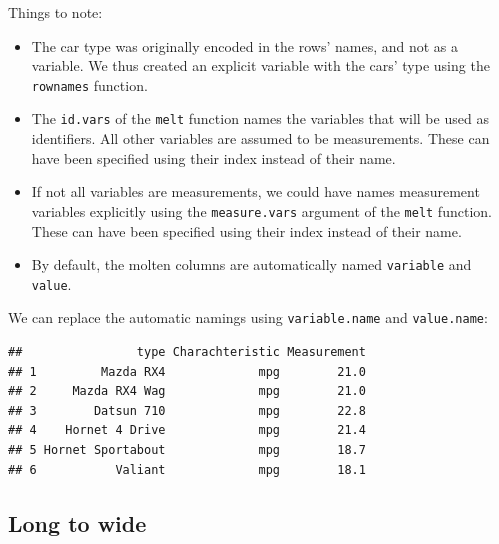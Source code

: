 \documentclass[]{book}
\newenvironment{Shaded}{\begin{snugshade}}{\end{snugshade}}
\newcommand{\KeywordTok}[1]{\textcolor[rgb]{0.13,0.29,0.53}{\textbf{#1}}}
\newcommand{\DataTypeTok}[1]{\textcolor[rgb]{0.13,0.29,0.53}{#1}}
\newcommand{\StringTok}[1]{\textcolor[rgb]{0.31,0.60,0.02}{#1}}
\newcommand{\OperatorTok}[1]{\textcolor[rgb]{0.81,0.36,0.00}{\textbf{#1}}}
\newcommand{\NormalTok}[1]{#1}
\providecommand{\tightlist}{%
  \setlength{\itemsep}{0pt}\setlength{\parskip}{0pt}}
\theoremstyle{definition}
\theoremstyle{definition}
\theoremstyle{definition}
\theoremstyle{remark}
\begin{document}
Things to note:

\begin{itemize}
\tightlist
\item
  The car type was originally encoded in the rows' names, and not as a
  variable. We thus created an explicit variable with the cars' type
  using the \texttt{rownames} function.
\item
  The \texttt{id.vars} of the \texttt{melt} function names the variables
  that will be used as identifiers. All other variables are assumed to
  be measurements. These can have been specified using their index
  instead of their name.
\item
  If not all variables are measurements, we could have names measurement
  variables explicitly using the \texttt{measure.vars} argument of the
  \texttt{melt} function. These can have been specified using their
  index instead of their name.
\item
  By default, the molten columns are automatically named
  \texttt{variable} and \texttt{value}.
\end{itemize}

We can replace the automatic namings using \texttt{variable.name} and
\texttt{value.name}:

\begin{Shaded}
\end{Shaded}

\begin{verbatim}
##                type Charachteristic Measurement
## 1         Mazda RX4             mpg        21.0
## 2     Mazda RX4 Wag             mpg        21.0
## 3        Datsun 710             mpg        22.8
## 4    Hornet 4 Drive             mpg        21.4
## 5 Hornet Sportabout             mpg        18.7
## 6           Valiant             mpg        18.1
\end{verbatim}

\subsection{Long to wide}\label{long-to-wide}
\end{document}
